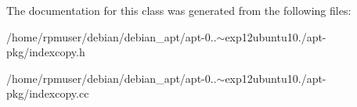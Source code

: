 \-The documentation for this class was generated from the following files\-:\begin{DoxyCompactItemize}
\item 
/home/rpmuser/debian/debian\-\_\-apt/apt-\/0..$\sim$exp12ubuntu10./apt-\/pkg/indexcopy.\-h\item 
/home/rpmuser/debian/debian\-\_\-apt/apt-\/0..$\sim$exp12ubuntu10./apt-\/pkg/indexcopy.\-cc\end{DoxyCompactItemize}
